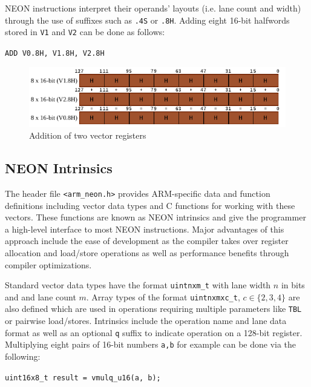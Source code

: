NEON instructions interpret their operands' layouts (i.e. lane count and width)
through the use of suffixes such as \texttt{.4S} or \texttt{.8H}. Adding eight
16-bit halfwords stored in \texttt{V1} and \texttt{V2} can be done as follows:

\begin{center}
    \texttt{ADD V0.8H, V1.8H, V2.8H}
\end{center}

\begin{figure}[h!]
    \centering
    \includegraphics[width=\textwidth]{Figures/vector_add.pdf}
    \caption{Addition of two vector registers}
\end{figure}

\subsection{NEON Intrinsics}

The header file \texttt{<arm\_neon.h>} provides ARM-specific data and function
definitions including vector data types and C functions for working with these
vectors. These functions are known as NEON intrinsics \cite{neonintr:2022} and
give the programmer a high-level interface to most NEON instructions. Major
advantages of this approach include the ease of development as the compiler
takes over register allocation and load/store operations as well as performance
benefits through compiler optimizations.

Standard vector data types have the format \texttt{uintnxm\_t} with lane width
$n$ in bits and and lane count $m$. Array types of the format
\texttt{uintnxmxc\_t}, $c\in\{2,3,4\}$ are also defined which are used in
operations requiring multiple parameters like \texttt{TBL} or pairwise
load/stores. Intrinsics include the operation name and lane data format as well
as an optional \texttt{q} suffix to indicate operation on a 128-bit register.
Multiplying eight pairs of 16-bit numbers \texttt{a,b} for example can be done
via the following:

\begin{center}
    \texttt{uint16x8\_t result = vmulq\_u16(a, b);}
\end{center}

